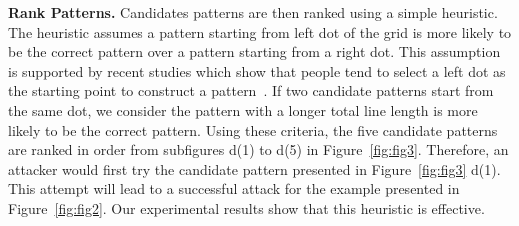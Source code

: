        \noindent \textbf{Rank Patterns.} Candidates patterns are then ranked using a simple
        heuristic. The heuristic assumes a pattern starting from
        left dot of the grid is more likely to be the correct pattern over a
         pattern starting from a right dot. This assumption is supported
        by recent studies which show that people tend to select a left dot as the starting point
        to construct a pattern~\cite{uellenbeck2013quantifying,alpnorway}.
         If two candidate patterns
         start from the same dot, we consider the pattern with a
        longer total line length
        is more likely to be the correct pattern. Using these criteria,
        the five candidate patterns are ranked in order from subfigures d(1) to d(5) in
        Figure~\ref{fig:fig3}. Therefore, an attacker would first try the candidate
        pattern presented in Figure~\ref{fig:fig3} d(1).  This attempt will lead to a
        successful attack for the example presented in Figure~\ref{fig:fig2}. Our experimental results show that
        this heuristic is effective.


